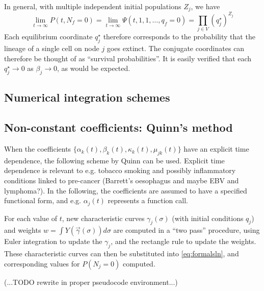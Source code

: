 \documentclass{article}
\begin{document}
In general, with multiple independent initial populations $Z_j$, we have 
\begin{equation}
    \lim_{t\rightarrow \infty} P(t, N_f = 0) = 
    \lim_{t\rightarrow \infty} \Psi(t,1,1,\dots,q_f=0) =
    \prod_{j \in V} \left(q^\star_j\right)^{Z_j}
\end{equation}
Each equilibrium coordinate $q^\star_j$ therefore corresponds to the
probability that the lineage of a single cell on node $j$ goes extinct. The
conjugate coordinates can therefore be thought of as ``survival probabilities''.
It is easily verified that each $q^\star_j \rightarrow 0$ as 
$\beta_j \rightarrow 0$, as would be expected.

\subsection{Numerical integration schemes}



\subsection*{Non-constant coefficients: Quinn's method}
When the coefficients $\{\alpha_k(t), \beta_k(t), \kappa_k(t), \mu_{jk}(t)\}$
have an explicit time dependence, the following scheme by Quinn can be used\cite{quinn1989calculating}. Explicit time dependence is relevant to e.g. tobacco smoking
and possibly inflammatory conditions linked to pre-cancer (Barrett's oesophagus and maybe
EBV and lymphoma?). In the following, the coefficients are assumed to have a
specified functional form, and e.g. $\alpha_j(t)$ represents a function call.

For each value of $t$, new characteristic curves $\gamma_j(\sigma)$ (with initial
conditions $q_j$) and weights
$w = \int Y(\vec{\gamma}(\sigma)) d\sigma$ are computed in a ``two pass'' procedure, using Euler
integration to update the $\gamma_j$, and the rectangle rule to update the
weights. These
characteristic curves can then be substituted into \eqref{eq:formalsln}, and
corresponding values for $P(N_j = 0)$ computed.

(...TODO rewrite in proper pseudocode environment...)
\end{document}
